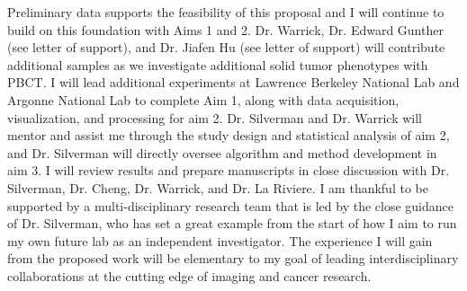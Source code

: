 \documentclass{NIHGrant}
\begin{document}
Preliminary data supports the feasibility of this proposal and I will continue to build on this foundation with Aims 1 and 2. Dr. Warrick, Dr. Edward Gunther (see letter of support), and Dr. Jiafen Hu (see letter of support) will contribute additional samples as we investigate additional solid tumor phenotypes with PBCT. I will lead additional experiments at Lawrence Berkeley National Lab and Argonne National Lab to complete Aim 1, along with data acquisition, visualization, and processing for aim 2. Dr. Silverman and Dr. Warrick will mentor and assist me through the study design and statistical analysis of aim 2, and Dr. Silverman will directly oversee algorithm and method development in aim 3. I will review results and prepare manuscripts in close discussion with Dr. Silverman, Dr. Cheng, Dr. Warrick, and Dr. La Riviere. I am thankful to be supported by a multi-disciplinary research team that is led by the close guidance of Dr. Silverman, who has set a great example from the start of how I aim to run my own future lab as an independent investigator. The experience I will gain from the proposed work will be elementary to my goal of leading interdisciplinary collaborations at the cutting edge of imaging and cancer research.


\end{document}
